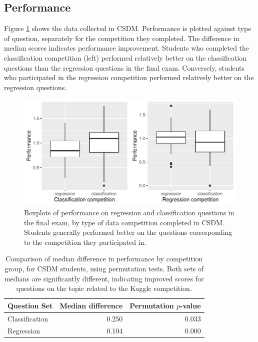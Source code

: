 \documentclass[12pt]{article}
\begin{document}
\subsection{Performance}\label{performance-1}

Figure \ref{fig:MAST90083} shows the data collected in CSDM. Performance
is plotted against type of question, separately for the competition they
completed. The difference in median scores indicates performance
improvement. Students who completed the classification competition
(left) performed relatively better on the classification questions than
the regression questions in the final exam. Conversely, students who
participated in the regression competition performed relatively better
on the regression questions.

\begin{figure}
\centering
\includegraphics{paper-kaggle_files/figure-latex/Melb-1.pdf}
\caption{\label{fig:MAST90083} Boxplots of performance on regression and
classification questions in the final exam, by type of data competition
completed in CSDM. Students generally performed better on the questions
corresponding to the competition they participated in.}
\end{figure}

\begin{table}[h]
\begin{center}
\begin{tabular}{|l|r|r|}\hline
Question Set & Median difference & Permutation $p$-value \\\hline
Classification & 0.250 & 0.033\\
Regression & 0.104 & 0.000\\\hline
\end{tabular}
\caption{Comparison of median difference in performance by competition group, for CSDM students, using permutation tests. Both sets of medians are significantly different, indicating improved scores for questions on the topic related to the Kaggle competition.}
\end{center}
\label{tab:Melb_Perm}
\end{table}
\end{document}
